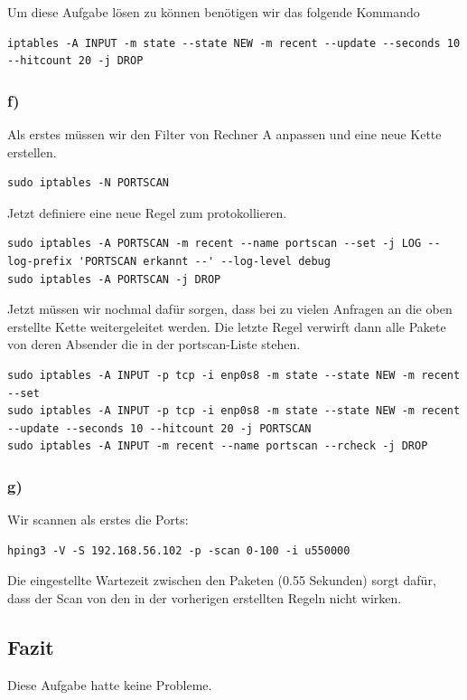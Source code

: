 Um diese Aufgabe lösen zu können benötigen wir das folgende Kommando
\begin{lstlisting}
iptables -A INPUT -m state --state NEW -m recent --update --seconds 10 --hitcount 20 -j DROP
\end{lstlisting}

\subsubsection{f)}
Als erstes müssen wir den Filter von Rechner A anpassen und eine neue Kette erstellen. 
\begin{lstlisting}
sudo iptables -N PORTSCAN
\end{lstlisting}
Jetzt definiere eine neue Regel zum protokollieren.
\begin{lstlisting}
sudo iptables -A PORTSCAN -m recent --name portscan --set -j LOG --log-prefix 'PORTSCAN erkannt --' --log-level debug
sudo iptables -A PORTSCAN -j DROP
\end{lstlisting}
Jetzt müssen wir nochmal dafür sorgen, dass bei zu vielen Anfragen an die oben erstellte Kette weitergeleitet werden. Die letzte Regel verwirft dann alle Pakete von deren Absender die in der portscan-Liste stehen.
\begin{lstlisting}
sudo iptables -A INPUT -p tcp -i enp0s8 -m state --state NEW -m recent --set
sudo iptables -A INPUT -p tcp -i enp0s8 -m state --state NEW -m recent --update --seconds 10 --hitcount 20 -j PORTSCAN
sudo iptables -A INPUT -m recent --name portscan --rcheck -j DROP
\end{lstlisting}

\subsubsection{g)}
Wir scannen als erstes die Ports:
\begin{lstlisting}
hping3 -V -S 192.168.56.102 -p -scan 0-100 -i u550000
\end{lstlisting}
Die eingestellte Wartezeit zwischen den Paketen (0.55 Sekunden) sorgt dafür, dass der Scan von den in der vorherigen erstellten Regeln nicht wirken.

\subsection{Fazit}
Diese Aufgabe hatte keine Probleme.
